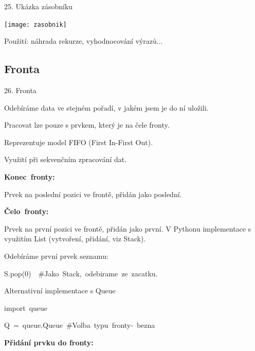 \documentclass[czech]{beamer}
\newenvironment{lyxcode}
  {\par\begin{list}{}{
    \setlength{\rightmargin}{\leftmargin}
    \setlength{\listparindent}{0pt}%
    \raggedright
    \setlength{\itemsep}{0pt}
    \setlength{\parsep}{0pt}
    \normalfont\ttfamily}%
   \def\{{\char`\{}
   \def\}{\char`\}}
   \def\textasciitilde{\char`\~}
   \item[]}
  {\end{list}}
\begin{document}
\begin{frame}{25. Ukázka zásobníku}

\begin{center}
\texttt{[image: zasobnik]}
\par\end{center}

Použití: náhrada rekurze, vyhodnocování výrazů...
\end{frame}


\subsection{Fronta}
\begin{frame}{26. Fronta}

{\tiny Odebíráme data ve stejném pořadí, v jakém jsem je do ní uložili. }{\tiny\par}

{\tiny Pracovat lze pouze s prvkem, který je na čele fronty.}{\tiny\par}

{\tiny Reprezentuje model FIFO (First In-First Out).}{\tiny\par}

{\tiny Využití při sekvenčním zpracování dat.\medskip{}
}{\tiny\par}

{\tiny\textbf{Konec~fronty:}}{\tiny\par}

{\tiny Prvek na poslední pozici ve frontě, přidán jako poslední.\medskip{}
}{\tiny\par}

{\tiny\textbf{Čelo~fronty:}}{\tiny\par}

{\tiny Prvek na první pozici ve frontě, přidán jako první.\medskip{}
V Pythonu implementace s využitím List (vytvoření, přidání, viz Stack).}{\tiny\par}

{\tiny Odebíráme první prvek seznamu:}{\tiny\par}
\begin{lyxcode}
{\tiny S.pop(0)~~\#Jako~Stack,~odebirame~ze~zacatku.}{\tiny\par}
\end{lyxcode}
{\tiny Alternativní implementace s Queue}{\tiny\par}
\begin{lyxcode}
{\tiny import~queue}{\tiny\par}

{\tiny Q~=~queue.Queue~\#Volba~typu~fronty-~bezna}{\tiny\par}
\end{lyxcode}
{\tiny\textbf{Přidání prvku do fronty:}}{\tiny\par}


\end{frame}
\end{document}
